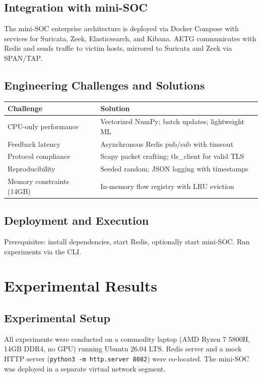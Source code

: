 \documentclass[review]{elsarticle}
\begin{document}
\subsection{Integration with mini-SOC}
The mini-SOC enterprise architecture is deployed via Docker Compose with services for Suricata, Zeek, Elasticsearch, and Kibana. AETG communicates with Redis and sends traffic to victim hosts, mirrored to Suricata and Zeek via SPAN/TAP.

\subsection{Engineering Challenges and Solutions}
\begin{table}[htbp]
\small
\centering
\renewcommand{\arraystretch}{1.2}
\begin{tabular}{|p{3.6cm}|p{7cm}|}
\hline
\textbf{Challenge} & \textbf{Solution} \\
\hline
CPU-only performance & Vectorized NumPy; batch updates; lightweight ML \\
Feedback latency & Asynchronous Redis pub/sub with timeout \\
Protocol compliance & Scapy packet crafting; tls\_client for valid TLS \\
Reproducibility & Seeded random; JSON logging with timestamps \\
Memory constraints (14GB) & In-memory flow registry with LRU eviction \\
\hline
\end{tabular}
\end{table}

\subsection{Deployment and Execution}
Prerequisites: install dependencies, start Redis, optionally start mini-SOC. Run experiments via the CLI.

\section{Experimental Results}
\label{sec:results}

\subsection{Experimental Setup}
All experiments were conducted on a commodity laptop (AMD Ryzen 7 5800H, 14GB DDR4, no GPU) running Ubuntu 26.04 LTS. Redis server and a mock HTTP server (\texttt{python3 -m http.server 8082}) were co-located. The mini-SOC was deployed in a separate virtual network segment.
\end{document}
